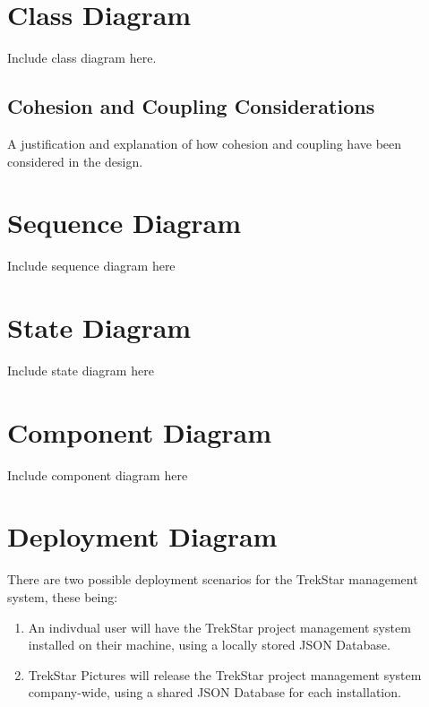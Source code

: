 \documentclass[
  english,
  a4paper,
,tablecaptionabove
]{scrartcl}
\providecommand{\tightlist}{%
  \setlength{\itemsep}{0pt}\setlength{\parskip}{0pt}}
\begin{document}
\newpage

\hypertarget{class-diagram}{%
\section{Class Diagram}\label{class-diagram}}

Include class diagram here.

\hypertarget{cohesion-and-coupling-considerations}{%
\subsection{Cohesion and Coupling
Considerations}\label{cohesion-and-coupling-considerations}}

A justification and explanation of how cohesion and coupling have been
considered in the design.

\newpage

\hypertarget{sequence-diagram}{%
\section{Sequence Diagram}\label{sequence-diagram}}

Include sequence diagram here

\newpage

\hypertarget{state-diagram}{%
\section{State Diagram}\label{state-diagram}}

Include state diagram here

\newpage

\hypertarget{component-diagram}{%
\section{Component Diagram}\label{component-diagram}}

Include component diagram here

\newpage

\hypertarget{deployment-diagram}{%
\section{Deployment Diagram}\label{deployment-diagram}}

There are two possible deployment scenarios for the TrekStar management
system, these being:

\begin{enumerate}
\def\labelenumi{\arabic{enumi}.}
\tightlist
\item
  An indivdual user will have the TrekStar project management system
  installed on their machine, using a locally stored JSON Database.
\item
  TrekStar Pictures will release the TrekStar project management system
  company-wide, using a shared JSON Database for each installation.
\end{enumerate}
\end{document}
